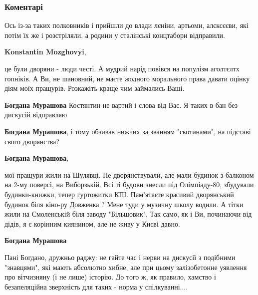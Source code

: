  
 
 
 
 
\subsubsection{Коментарі}
\label{sec:19_09_2019.fb.fb_group.zkkk.1.shuljavska_respublika.cmt}

\begin{itemize} %

Ось із-за таких полковників і прийшли до влади лєніни, артьоми, алєксєєви, які
потім їх же і розстріляли, а родини у сталінські концтабори відправили.

\begin{itemize} %
\textbf{Konstantin Mozghovyi}, 

це були дворяни - люди честі. А мудрий нарід повівся на популізм аголтєлтх
гопніків. А Ви, не шановний, не маєте жодного морального права давати оцінку
діям моїх пращурів. Розкажіть краще чим займались Ваші.

\begin{itemize} %
\textbf{Богдана Мурашова} Костянтин не вартий і слова від Вас. Я таких в бан без дискусій відправляю

\textbf{Богдана Мурашова}, і тому обзивав нижчих за званням "скотинами", на підставі свого дворянства?

\textbf{Богдана Мурашова}, 

мої пращури жили на Шулявці. Не дворянствували, але мали будинок з балконом на
2-му поверсі, на Виборзькій. Всі ті будови знесли під Олімпіаду-80, збудували
будинки-книжки, тепер гуртожитки КПІ. Пам'ятаєте красивий дворянський будинок
біля кіно-ру Довженка ? Мене туди у музичну школу водили. А тітки жили на
Смоленській біля заводу "Більшовик". Так само, як і Ви, починаючи від дідів,
я є корінним киянином, але не живу у Києві давно.

\textbf{Богдана Мурашова} 

Пані Богдано, дружньо раджу: не гайте час і нерви на дискусії з подібними
"знавцями", які мають абсолютно хибне, але при цьому залізобетонне уявлення про
вітчизняну (і не лише) історію. До того ж, як правило, хамство і безапеляційна
зверхність для таких - норма у спілкуванні....


\end{itemize}
\end{itemize}
\end{itemize}
